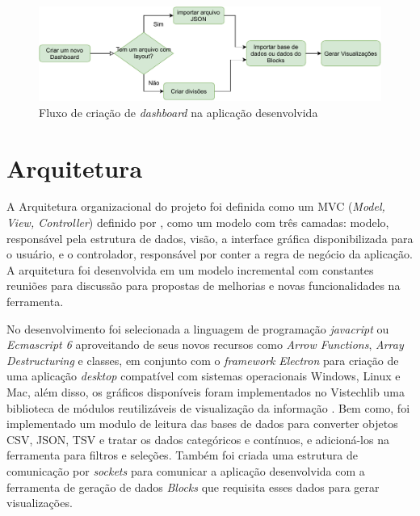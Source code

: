 \documentclass[
	12pt,				%
	openright,			%
	oneside,			%
	a4paper,			%
	english,			%
	brazil				%
	]{abntex2}
\begin{document}
\begin{figure}[h]
	\caption{\label{fig_fluxo} Fluxo de criação de \textit{dashboard} na aplicação desenvolvida}
	\begin{center}
	    \includegraphics[width=\textwidth,scale=1]{figures/Diagrama de fluxo tcc.pdf}
	\end{center}
\end{figure}

\section{Arquitetura}
A Arquitetura organizacional do projeto foi definida como um MVC (\textit{Model, View, Controller}) definido por \cite{deacon2009model}, como um modelo com três camadas: modelo, responsável pela estrutura de dados, visão, a interface gráfica disponibilizada para o usuário, e o controlador, responsável por conter a regra de negócio da aplicação. A arquitetura foi desenvolvida em um modelo incremental com constantes reuniões para discussão para propostas de melhorias e novas funcionalidades na ferramenta. 

No desenvolvimento foi selecionada a linguagem de programação \textit{javacript} ou \textit{Ecmascript 6} aproveitando de seus novos recursos como \textit{Arrow Functions}, \textit{Array Destructuring} e classes, em conjunto com o \textit{framework} \textit{Electron} \cite{electron} para criação de uma aplicação \textit{desktop} compatível com sistemas operacionais Windows, Linux e Mac, além disso, os gráficos disponíveis foram implementados no Vistechlib uma biblioteca de módulos reutilizáveis de visualização da informação \cite{Vistechlib}. Bem como, foi implementado um modulo de leitura das bases de dados para converter objetos CSV, JSON, TSV e tratar os dados categóricos e contínuos, e adicioná-los na ferramenta para filtros e seleções. Também foi criada uma estrutura de comunicação por \textit{sockets} para comunicar a aplicação desenvolvida com a ferramenta de geração de dados \textit{Blocks} \cite{blocks} que requisita esses dados para gerar visualizações.
\end{document}
